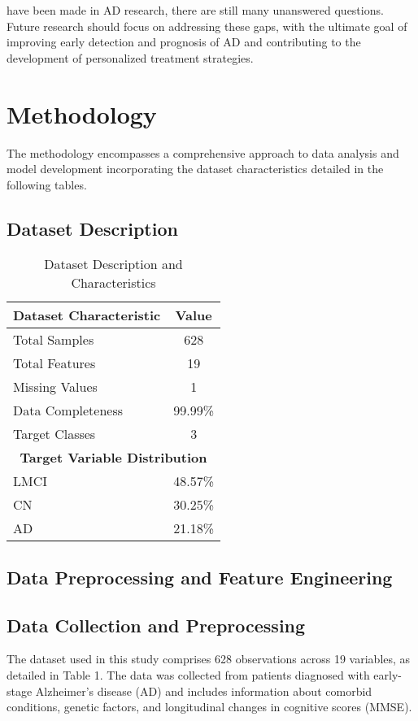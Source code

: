 \documentclass[conference]{IEEEtran}
\begin{document}
have been made in AD research, there are still many unanswered questions. Future research should focus on addressing these gaps, with the ultimate goal of improving early detection and prognosis of AD and contributing to the development of personalized treatment strategies.

\section{Methodology}
The methodology encompasses a comprehensive approach to data analysis and model development incorporating the dataset characteristics detailed in the following tables.

\subsection{Dataset Description}

\begin{table}[!h]
\centering
\caption{Dataset Description and Characteristics}
\label{tab:dataset_description}
\begin{tabular}{|l|c|}
\hline
\textbf{Dataset Characteristic} & \textbf{Value} \\
\hline
Total Samples & 628 \\
\hline
Total Features & 19 \\
\hline
Missing Values & 1 \\
\hline
Data Completeness & 99.99\% \\
\hline
Target Classes & 3 \\
\hline
\hline
\multicolumn{2}{|c|}{\textbf{Target Variable Distribution}} \\
\hline
LMCI & 48.57\% \\
\hline
CN & 30.25\% \\
\hline
AD & 21.18\% \\
\hline
\end{tabular}
\end{table}



\subsection{Data Preprocessing and Feature Engineering}
\subsection{Data Collection and Preprocessing}
The dataset used in this study comprises 628 observations across 19 variables, as detailed in Table 1. The data was collected from patients diagnosed with early-stage Alzheimer's disease (AD) and includes information about comorbid conditions, genetic factors, and longitudinal changes in cognitive scores (MMSE). 
\end{document}
